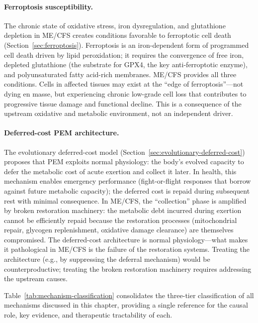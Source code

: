 \paragraph{Ferroptosis susceptibility.} The chronic state of oxidative stress, iron dysregulation, and glutathione depletion in ME/CFS creates conditions favorable to ferroptotic cell death (Section~\ref{sec:ferroptosis}). Ferroptosis is an iron-dependent form of programmed cell death driven by lipid peroxidation; it requires the convergence of free iron, depleted glutathione (the substrate for GPX4, the key anti-ferroptotic enzyme), and polyunsaturated fatty acid-rich membranes. ME/CFS provides all three conditions. Cells in affected tissues may exist at the ``edge of ferroptosis''---not dying en masse, but experiencing chronic low-grade cell loss that contributes to progressive tissue damage and functional decline. This is a consequence of the upstream oxidative and metabolic environment, not an independent driver.

\paragraph{Deferred-cost PEM architecture.} The evolutionary deferred-cost model (Section~\ref{sec:evolutionary-deferred-cost}) proposes that PEM exploits normal physiology: the body's evolved capacity to defer the metabolic cost of acute exertion and collect it later. In health, this mechanism enables emergency performance (fight-or-flight responses that borrow against future metabolic capacity); the deferred cost is repaid during subsequent rest with minimal consequence. In ME/CFS, the ``collection'' phase is amplified by broken restoration machinery: the metabolic debt incurred during exertion cannot be efficiently repaid because the restoration processes (mitochondrial repair, glycogen replenishment, oxidative damage clearance) are themselves compromised. The deferred-cost architecture is normal physiology---what makes it pathological in ME/CFS is the failure of the restoration systems. Treating the architecture (e.g., by suppressing the deferral mechanism) would be counterproductive; treating the broken restoration machinery requires addressing the upstream causes.


Table~\ref{tab:mechanism-classification} consolidates the three-tier classification of all mechanisms discussed in this chapter, providing a single reference for the causal role, key evidence, and therapeutic tractability of each.

